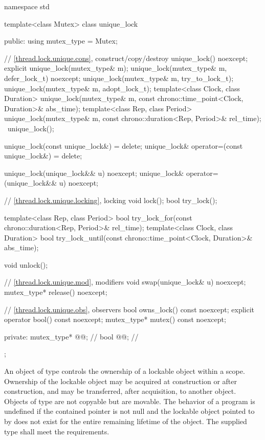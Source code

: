 %
\begin{codeblock}
namespace std {
  template<class Mutex>
  class unique_lock {
  public:
    using mutex_type = Mutex;

    // \ref{thread.lock.unique.cons}, construct/copy/destroy
    unique_lock() noexcept;
    explicit unique_lock(mutex_type& m);
    unique_lock(mutex_type& m, defer_lock_t) noexcept;
    unique_lock(mutex_type& m, try_to_lock_t);
    unique_lock(mutex_type& m, adopt_lock_t);
    template<class Clock, class Duration>
      unique_lock(mutex_type& m, const chrono::time_point<Clock, Duration>& abs_time);
    template<class Rep, class Period>
      unique_lock(mutex_type& m, const chrono::duration<Rep, Period>& rel_time);
    ~unique_lock();

    unique_lock(const unique_lock&) = delete;
    unique_lock& operator=(const unique_lock&) = delete;

    unique_lock(unique_lock&& u) noexcept;
    unique_lock& operator=(unique_lock&& u) noexcept;

    // \ref{thread.lock.unique.locking}, locking
    void lock();
    bool try_lock();

    template<class Rep, class Period>
      bool try_lock_for(const chrono::duration<Rep, Period>& rel_time);
    template<class Clock, class Duration>
      bool try_lock_until(const chrono::time_point<Clock, Duration>& abs_time);

    void unlock();

    // \ref{thread.lock.unique.mod}, modifiers
    void swap(unique_lock& u) noexcept;
    mutex_type* release() noexcept;

    // \ref{thread.lock.unique.obs}, observers
    bool owns_lock() const noexcept;
    explicit operator bool() const noexcept;
    mutex_type* mutex() const noexcept;

  private:
    mutex_type* @@;             // \expos
    bool @@;                  // \expos
  };
}
\end{codeblock}

\pnum
An object of type  controls the ownership of a lockable
object within a scope. Ownership of the lockable object may be acquired at
construction or after construction, and may be transferred, after
acquisition, to another  object. Objects of type  are not
copyable but are movable. The behavior of a program is undefined if the contained pointer
 is not null and the lockable object pointed
to by  does not exist for the entire remaining
lifetime of the  object. The supplied
 type shall meet the 
requirements.


